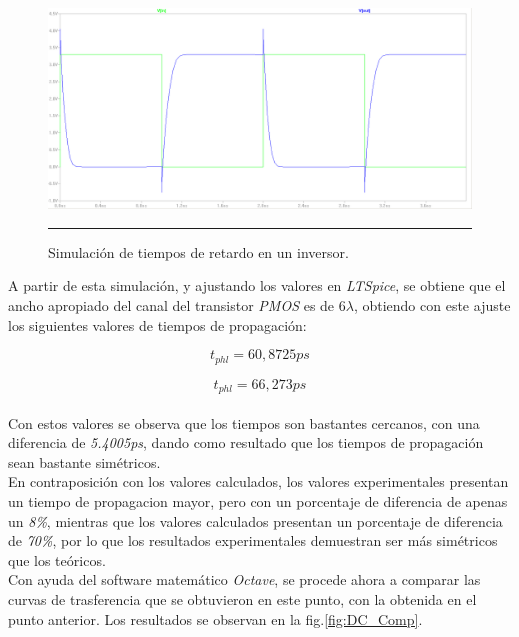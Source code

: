 \documentclass[12pt,a4paper]{article} %
\begin{document}
\begin{figure}[htbp]
  \centering
    \includegraphics[scale=0.35]{./tLH_tHL.png}
    \rule{35em}{0.3pt}
  \caption[INV2]{Simulación de tiempos de retardo en un inversor.}
  \label{fig:tLH_tHL}
\end{figure}

A partir de esta simulación, y ajustando los valores en \textit{LTSpice}, se obtiene que el ancho apropiado del canal del transistor \textit{PMOS} es de 6$\lambda$, obtiendo con este ajuste los siguientes valores de tiempos de propagación:

\begin{equation}\label{eqn:t_plh}
t_{phl} = 60,8725ps
\end{equation}

\begin{equation}\label{eqn:t_phl}
t_{phl} = 66,273ps
\end{equation}\\

Con estos valores se observa que los tiempos son bastantes cercanos, con una diferencia de \textit{5.4005ps}, dando como resultado que los tiempos de propagación sean bastante simétricos.\\

En contraposición con los valores calculados, los valores experimentales presentan un tiempo de propagacion mayor, pero con un porcentaje de diferencia de apenas un \textit{8\%}, mientras que los valores calculados presentan un porcentaje de diferencia de \textit{70\%}, por lo que los resultados experimentales demuestran ser más simétricos que los teóricos.\\


Con ayuda del software matemático \textit{Octave}, se procede ahora a comparar las curvas de trasferencia que se obtuvieron en este punto, con la obtenida en el punto anterior. Los resultados se observan en la fig.\ref{fig:DC_Comp}.\\
\end{document}

